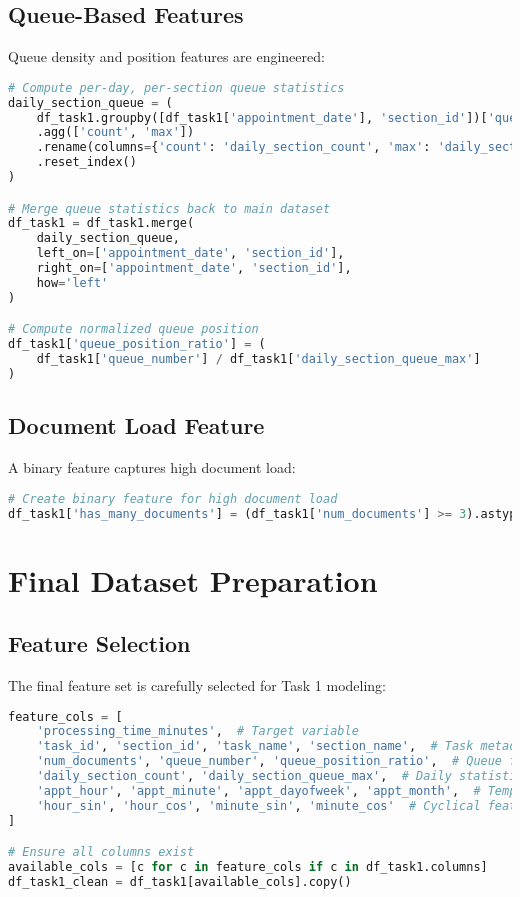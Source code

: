 \documentclass[12pt,a4paper]{article}
\begin{document}
\subsection{Queue-Based Features}

Queue density and position features are engineered:

\begin{lstlisting}[language=Python, caption=Queue Feature Engineering]
# Compute per-day, per-section queue statistics
daily_section_queue = (
    df_task1.groupby([df_task1['appointment_date'], 'section_id'])['queue_number']
    .agg(['count', 'max'])
    .rename(columns={'count': 'daily_section_count', 'max': 'daily_section_queue_max'})
    .reset_index()
)

# Merge queue statistics back to main dataset
df_task1 = df_task1.merge(
    daily_section_queue,
    left_on=['appointment_date', 'section_id'],
    right_on=['appointment_date', 'section_id'],
    how='left'
)

# Compute normalized queue position
df_task1['queue_position_ratio'] = (
    df_task1['queue_number'] / df_task1['daily_section_queue_max']
)
\end{lstlisting}

\subsection{Document Load Feature}

A binary feature captures high document load:

\begin{lstlisting}[language=Python, caption=Document Load Feature]
# Create binary feature for high document load
df_task1['has_many_documents'] = (df_task1['num_documents'] >= 3).astype(int)
\end{lstlisting}

\section{Final Dataset Preparation}

\subsection{Feature Selection}

The final feature set is carefully selected for Task 1 modeling:

\begin{lstlisting}[language=Python, caption=Feature Selection]
feature_cols = [
    'processing_time_minutes',  # Target variable
    'task_id', 'section_id', 'task_name', 'section_name',  # Task metadata
    'num_documents', 'queue_number', 'queue_position_ratio',  # Queue features
    'daily_section_count', 'daily_section_queue_max',  # Daily statistics
    'appt_hour', 'appt_minute', 'appt_dayofweek', 'appt_month',  # Temporal
    'hour_sin', 'hour_cos', 'minute_sin', 'minute_cos'  # Cyclical features
]

# Ensure all columns exist
available_cols = [c for c in feature_cols if c in df_task1.columns]
df_task1_clean = df_task1[available_cols].copy()
\end{lstlisting}
\end{document}
